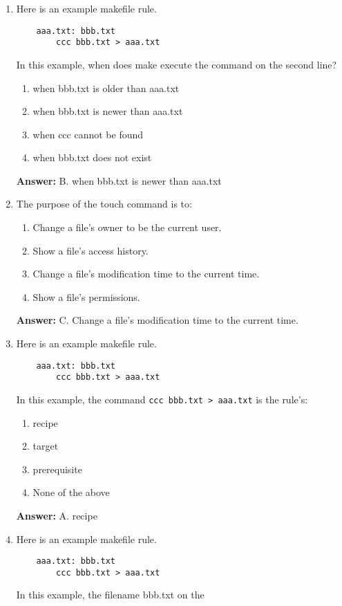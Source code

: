 \documentclass{article}
\begin{document}
\begin{enumerate}
    \item Here is an example makefile rule.
    \begin{verbatim}
    aaa.txt: bbb.txt
        ccc bbb.txt > aaa.txt
    \end{verbatim}
    In this example, when does make execute the command on the second line?
    \begin{enumerate}
        \item when bbb.txt is older than aaa.txt
        \item when bbb.txt is newer than aaa.txt
        \item when ccc cannot be found
        \item when bbb.txt does not exist
    \end{enumerate}
    \textbf{Answer:} B. when bbb.txt is newer than aaa.txt

    \item The purpose of the touch command is to:
    \begin{enumerate}
        \item Change a file's owner to be the current user.
        \item Show a file's access history.
        \item Change a file's modification time to the current time.
        \item Show a file's permissions.
    \end{enumerate}
    \textbf{Answer:} C. Change a file's modification time to the current time.

    \item Here is an example makefile rule.
    \begin{verbatim}
    aaa.txt: bbb.txt
        ccc bbb.txt > aaa.txt
    \end{verbatim}
    In this example, the command \texttt{ccc bbb.txt > aaa.txt} is the rule's:
    \begin{enumerate}
        \item recipe
        \item target
        \item prerequisite
        \item None of the above
    \end{enumerate}
    \textbf{Answer:} A. recipe

    \item Here is an example makefile rule.
    \begin{verbatim}
    aaa.txt: bbb.txt
        ccc bbb.txt > aaa.txt
    \end{verbatim}
    In this example, the filename bbb.txt on the
\end{enumerate}
\end{document}
